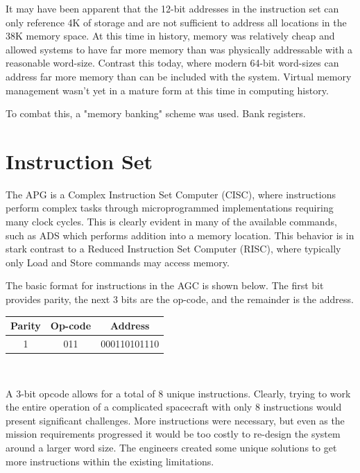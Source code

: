 \documentclass[a4paper,11pt]{article}
\begin{document}
It may have been apparent that the 12-bit addresses in the instruction set can only reference 4K of storage and are not sufficient to address all locations in the 38K memory space.  At this time in history, memory was relatively cheap and allowed systems to have far more memory than was physically addressable with a reasonable word-size.  Contrast this today, where modern 64-bit word-sizes can address far more memory than can be included with the system.  
Virtual memory management wasn't yet in a mature form at this time in computing history. 

To combat this, a "memory banking" scheme was used. Bank registers.


\section{Instruction Set}
The APG is a Complex Instruction Set Computer (CISC), where instructions perform complex tasks through microprogrammed implementations requiring many clock cycles.  This is clearly evident in many of the available commands, such as ADS which performs addition into a memory location.  This behavior is in stark contrast to a Reduced Instruction Set Computer (RISC), where typically only Load and Store commands may access memory.  

The basic format for instructions in the AGC is shown below.  The first bit provides parity, the next 3 bits are the op-code, and the remainder is the address.  

\begin{center}
\begin{tabular}{| c | c | c |}
  \hline	
  	Parity & Op-code & Address \\ \hline \hline
	1 & 011 & 000110101110 \\ \hline
\end{tabular} \\
\end{center}

A 3-bit opcode allows for a total of 8 unique instructions.  Clearly, trying to work the entire operation of a complicated spacecraft with only 8 instructions would present significant challenges.  More instructions were necessary, but even as the mission requirements progressed it would be too costly to re-design the system around a larger word size.  The engineers created some unique solutions to get more instructions within the existing limitations.
\end{document}
